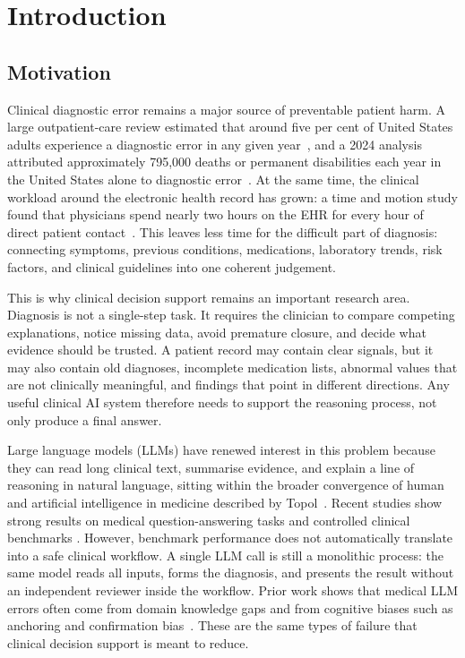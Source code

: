 \chapter{Introduction}
\label{chap:introduction}

\section{Motivation}
\label{sec:motivation}

Clinical diagnostic error remains a major source of preventable patient harm. A
large outpatient-care review estimated that around five per cent of United
States adults experience a diagnostic error in any given
year~\cite{Singh2014DiagnosticErrors}, and a 2024 analysis attributed
approximately 795{,}000 deaths or permanent disabilities each year in the United
States alone to diagnostic error~\cite{NewmanToker2024Burden}. At the same
time, the clinical workload around the electronic health record has grown: a
time and motion study found that physicians spend nearly two hours on the EHR
for every hour of direct patient contact~\cite{Sinsky2016Allocation}. This
leaves less time for the difficult part of diagnosis: connecting symptoms,
previous conditions, medications, laboratory trends, risk factors, and clinical
guidelines into one coherent judgement.

This is why clinical decision support remains an important research area.
Diagnosis is not a single-step task. It requires the clinician to compare
competing explanations, notice missing data, avoid premature closure, and decide
what evidence should be trusted. A patient record may contain clear signals, but
it may also contain old diagnoses, incomplete medication lists, abnormal values
that are not clinically meaningful, and findings that point in different
directions. Any useful clinical AI system therefore needs to support the
reasoning process, not only produce a final answer.

Large language models (LLMs) have renewed interest in this problem because they
can read long clinical text, summarise evidence, and explain a line of reasoning
in natural language, sitting within the broader convergence of human and
artificial intelligence in medicine described by
Topol~\cite{Topol2019HighPerformance}. Recent studies show strong results on
medical question-answering tasks and controlled clinical benchmarks
\cite{Abbasian2024openCHA,Tang2024MedAgents,Kim2024MDAgents}. However, benchmark performance
does not automatically translate into a safe clinical workflow. A single LLM
call is still a monolithic process: the same model reads all inputs, forms the
diagnosis, and presents the result without an independent reviewer inside the
workflow. Prior work shows that medical LLM errors often come from domain
knowledge gaps and from cognitive biases such as anchoring and confirmation
bias~\cite{Tang2024MedAgents,Ke2024CognitiveBias}. These are the same types of
failure that clinical decision support is meant to reduce.


